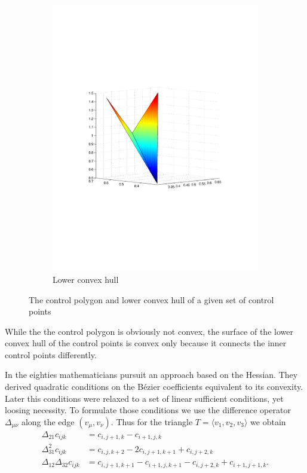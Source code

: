 \begin{figure}[h]
\begin{subfigure}[b]{.5\textwidth}
	\includegraphics[trim=3cm 8cm 3cm 8cm, width=1.\textwidth]{convex_hull2.pdf}
	\caption{Lower convex hull}
\end{subfigure}
\caption{The control polygon and lower convex hull of a given set of control points}
\label{fig: diff connectivity}
\end{figure}
While the the control polygon is obviously not convex, the surface of the lower convex hull of the control points is convex only because it connects the inner control points differently.

In the eighties mathematicians pursuit an approach based on the Hessian. They derived quadratic conditions on the B\'ezier coefficients equivalent to its convexity. Later this conditions were relaxed to a set of linear sufficient conditions, yet loosing necessity.  To formulate those conditions we use the difference operator $\Delta_{\mu \nu}$ along the edge $(v_\mu, v_\nu)$. 
Thus for the triangle $T=\langle v_1, v_2,v_3 \rangle$ 
we obtain
	\begin{align*}
		\Delta_{21} c_{ijk} &= c_{i,j+1,k} -c_{i+1, j,k}  \\
		\Delta_{31}^2 c_{ijk} &= c_{i,j,k+2} -2c_{i, j+1,k+1} +c_{i, j+2,k} \\
		\Delta_{12} \Delta_{32} c_{ijk} &= c_{i,j+1,k+1} -c_{i+1, j,k+1} - c_{i,j+2,k} +c_{i+1, j+1,k}.
	\end{align*}
 
